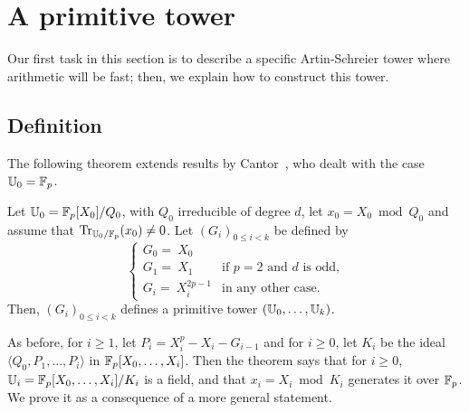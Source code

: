 

\section{A primitive tower}
\label{sec:fast-tower}

Our first task in this section is to describe a specific
Artin-Schreier tower where arithmetic will be fast; then, we explain
how to construct this tower. 


\subsection{Definition}

The following theorem extends results by
Cantor~\cite[Theorem~1.2]{cantor89}, who dealt with the case
$\mathbb{U}_0=\mathbb{F}_p$.

\begin{theorem}
  \label{th:cantor}
  Let $\mathbb{U}_0=\mathbb{F}_p[X_0]/Q_0$, with $Q_0$ irreducible of
  degree $d$, let $x_0 = X_0 \bmod Q_0$ and assume that
  $\operatorname{Tr}_{\mathbb{U}_0/\mathbb{F}_p}(x_0)\ne0$. Let $(G_i)_{0 \le i <k}$ be defined by
$$ \begin{cases}
G_0 = ~X_0\\
G_1 = ~X_1        &\text{if $p=2$ and $d$ is odd,}\\
G_i = ~X_i^{2p-1} &\text{in any other case.}
\end{cases}$$
Then, $(G_i)_{0 \le i <k}$ defines a primitive tower $(\mathbb{U}_0,\dots,\mathbb{U}_k)$.
\end{theorem}

As before, for $i \ge 1$, let $P_i = X_i^p - X_i - G_{i-1}$ and for $i
\ge 0$, let $K_i$ be the ideal $\langle Q_0,P_1,\dots,P_i\rangle$ in
$\mathbb{F}_p[X_0,\dots,X_i]$.  Then the theorem says that for $i\ge 0$,
$\mathbb{U}_i=\mathbb{F}_p[X_0,\dots,X_i]/K_i$ is a field, and that $x_i=X_i \bmod
K_i$ generates it over $\mathbb{F}_p$.  We prove it as a consequence of a more
general statement.

